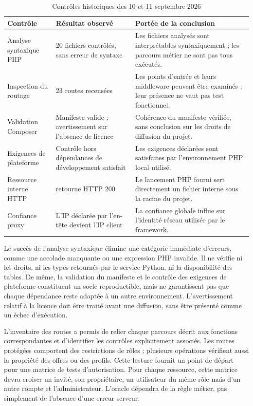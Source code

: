 \begin{table}[htbp]
\centering
\small
\caption{Contrôles historiques des 10 et 11 septembre 2026}
\label{tab:validation-outillage}
\begin{tabularx}{\textwidth}{@{}P{0.26\textwidth}P{0.26\textwidth}X@{}}
\toprule
Contrôle & Résultat observé & Portée de la conclusion \\
\midrule
Analyse syntaxique PHP & 20 fichiers contrôlés, sans erreur de syntaxe & Les fichiers analysés sont interprétables syntaxiquement ; les parcours métier ne sont pas tous exécutés. \\
Inspection du routage & 23 routes recensées & Les points d'entrée et leurs middleware peuvent être examinés ; leur présence ne vaut pas test fonctionnel. \\
Validation Composer & Manifeste valide ; avertissement sur l'absence de licence & Cohérence du manifeste vérifiée, sans conclusion sur les droits de diffusion du projet. \\
Exigences de plateforme & Contrôle hors dépendances de développement satisfait & Les exigences déclarées sont satisfaites par l'environnement PHP local utilisé. \\
Ressource interne HTTP &  retourne HTTP 200 & Le lancement PHP fourni sert directement un fichier interne sous la racine du projet. \\
Confiance proxy & L'IP déclarée par l'en-tête devient l'IP client & La confiance globale influe sur l'identité réseau utilisée par le framework. \\
\bottomrule
\end{tabularx}
\end{table}

Le succès de l'analyse syntaxique élimine une catégorie immédiate d'erreurs, comme une accolade manquante ou une expression PHP invalide. Il ne vérifie ni les droits, ni les types retournés par le service Python, ni la disponibilité des tables. De même, la validation du manifeste et le contrôle des exigences de plateforme constituent un socle reproductible, mais ne garantissent pas que chaque dépendance reste adaptée à un autre environnement. L'avertissement relatif à la licence doit être traité avant une diffusion, sans être présenté comme un échec d'exécution.

L'inventaire des routes a permis de relier chaque parcours décrit aux fonctions correspondantes et d'identifier les contrôles explicitement associés. Les routes protégées comportent des restrictions de rôles ; plusieurs opérations vérifient aussi la propriété des offres ou des profils. Cette lecture fournit un point de départ pour une matrice de tests d'autorisation. Pour chaque ressource, cette matrice devra croiser un invité, son propriétaire, un utilisateur du même rôle mais d'un autre compte et l'administrateur. L'oracle dépendra de la règle métier, pas simplement de l'absence d'une erreur serveur.

